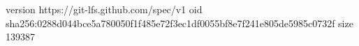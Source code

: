 version https://git-lfs.github.com/spec/v1
oid sha256:0288d044bce5a780050f1f485e72f3ec1df0055bf8e7f241e805de5985c0732f
size 139387
